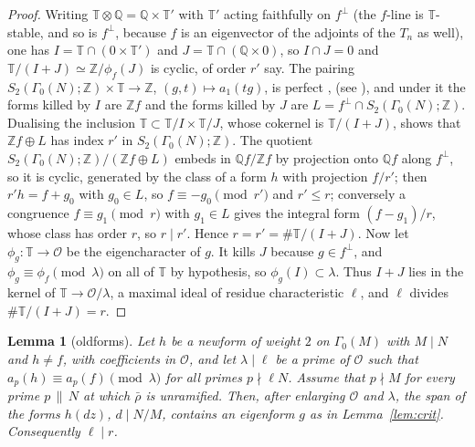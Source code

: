 \documentclass[11pt]{amsart}
\newtheorem{lemma}[theorem]{Lemma}
\theoremstyle{definition}
\newcommand{\Q}{\mathbb{Q}}
\newcommand{\Z}{\mathbb{Z}}
\newcommand{\T}{\mathbb{T}}
\begin{document}
\begin{proof}
Writing $\T\otimes\Q=\Q\times\T'$ with $\T'$ acting faithfully on $f^\perp$ (the $f$-line is $\T$-stable, and so is $f^\perp$, because $f$ is an eigenvector of the adjoints of the $T_n$ as well), one has $I=\T\cap(0\times\T')$ and $J=\T\cap(\Q\times0)$, so $I\cap J=0$ and $\T/(I+J)\simeq\Z/\phi_f(J)$ is cyclic, of order $r'$ say. The pairing $S_2(\Gamma_0(N);\Z)\times\T\to\Z$, $(g,t)\mapsto a_1(tg)$, is perfect \cite[Theorem 2.2]{Ribet83}, \cite[Lemma 2.1]{AU96} (see \cite[\S3]{ARS12}), and under it the forms killed by $I$ are $\Z f$ and the forms killed by $J$ are $L=f^\perp\cap S_2(\Gamma_0(N);\Z)$. Dualising the inclusion $\T\subset\T/I\times\T/J$, whose cokernel is $\T/(I+J)$, shows that $\Z f\oplus L$ has index $r'$ in $S_2(\Gamma_0(N);\Z)$. The quotient $S_2(\Gamma_0(N);\Z)/(\Z f\oplus L)$ embeds in $\Q f/\Z f$ by projection onto $\Q f$ along $f^\perp$, so it is cyclic, generated by the class of a form $h$ with projection $f/r'$; then $r'h=f+g_0$ with $g_0\in L$, so $f\equiv-g_0\pmod{r'}$ and $r'\le r$; conversely a congruence $f\equiv g_1\pmod r$ with $g_1\in L$ gives the integral form $(f-g_1)/r$, whose class has order $r$, so $r\mid r'$. Hence $r=r'=\#\T/(I+J)$. Now let $\phi_g\colon\T\to\mathcal{O}$ be the eigencharacter of $g$. It kills $J$ because $g\in f^\perp$, and $\phi_g\equiv\phi_f\pmod\lambda$ on all of $\T$ by hypothesis, so $\phi_g(I)\subset\lambda$. Thus $I+J$ lies in the kernel of $\T\to\mathcal{O}/\lambda$, a maximal ideal of residue characteristic $\ell$, and $\ell$ divides $\#\T/(I+J)=r$.
\end{proof}

\begin{lemma}[oldforms]\label{lem:old}
Let $h$ be a newform of weight $2$ on $\Gamma_0(M)$ with $M\mid N$ and $h\ne f$, with coefficients in $\mathcal{O}$, and let $\lambda\mid\ell$ be a prime of $\mathcal{O}$ such that $a_p(h)\equiv a_p(f)\pmod\lambda$ for all primes $p\nmid\ell N$. Assume that $p\nmid M$ for every prime $p\,\|\,N$ at which $\bar\rho$ is unramified. Then, after enlarging $\mathcal{O}$ and $\lambda$, the span of the forms $h(dz)$, $d\mid N/M$, contains an eigenform $g$ as in Lemma~\ref{lem:crit}. Consequently $\ell\mid r$.
\end{lemma}
\end{document}
